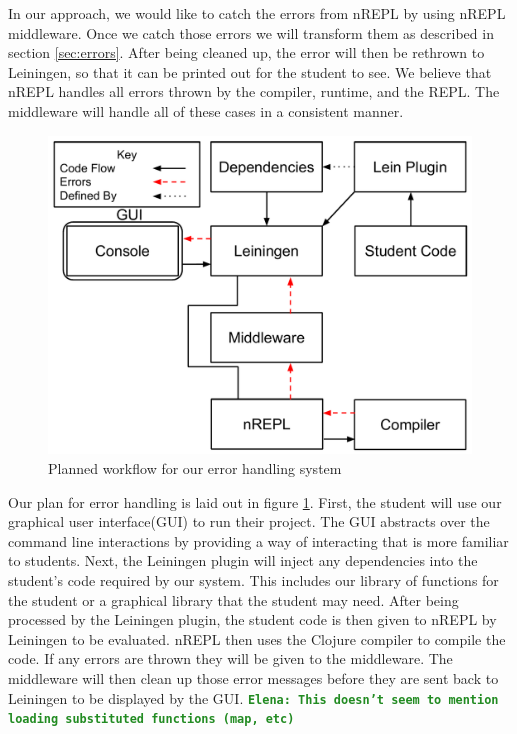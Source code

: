 \documentclass[12pt]{article}
\newcommand{\comment}[1]{{\bf \tt  {#1}}}
\newcommand{\emcomment}[1]{\textcolor{ForestGreen}{\comment{Elena: {#1}}}}
\begin{document}
In our approach, we would like to catch the errors from nREPL by using nREPL middleware. Once we catch those errors we will transform them as described in section \ref{sec:errors}. After being cleaned up, the error will then be rethrown to Leiningen, so that it can be printed out for the student to see. We believe that nREPL handles all errors thrown by the compiler, runtime, and the REPL. The middleware will handle all of these cases in a consistent manner.

\begin{figure}[h]
 \includegraphics[width=12cm]{OurErrorHandlingSystem.pdf}
 \centering
  \caption{Planned workflow for our error handling system}
 \label{fig:OurSystem}
\end{figure}

Our plan for error handling is laid out in figure \ref{fig:OurSystem}. First, the student will use our graphical user interface(GUI) to run their project. The GUI abstracts over the command line interactions by providing a way of interacting that is more familiar to students. Next, the Leiningen plugin will inject any dependencies into the student's code required by our system. This includes our library of functions for the student or a graphical library that the student may need. After being processed by the Leiningen plugin, the student code is then given to nREPL by Leiningen to be evaluated. nREPL then uses the Clojure compiler to compile the code. If any errors are thrown they will be given to the middleware. The middleware will then clean up those error messages before they are sent back to Leiningen to be displayed by the GUI.
\emcomment{This doesn't seem to mention loading substituted functions (map, etc)}
\end{document}
